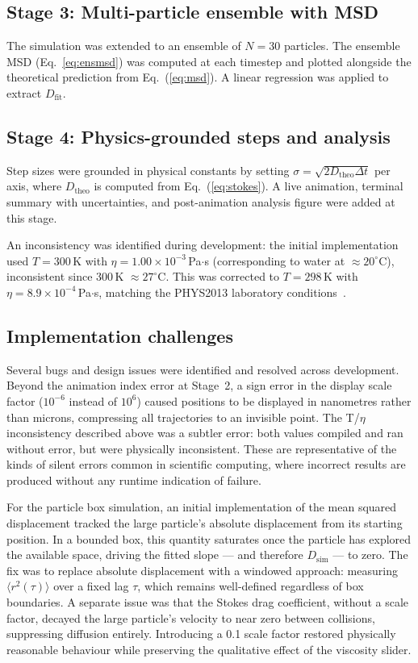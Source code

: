 \documentclass[prb,twocolumn]{revtex4-1}
\begin{document}
\subsection{Stage 3: Multi-particle ensemble with MSD}

The simulation was extended to an ensemble of $N = 30$ particles. The ensemble MSD (Eq.~\ref{eq:ensmsd}) was computed at each timestep and plotted alongside the theoretical prediction from Eq.~(\ref{eq:msd}). A linear regression was applied to extract $D_{\mathrm{fit}}$.

\subsection{Stage 4: Physics-grounded steps and analysis}

Step sizes were grounded in physical constants by setting $\sigma = \sqrt{2D_{\mathrm{theo}}\Delta t}$ per axis, where $D_{\mathrm{theo}}$ is computed from Eq.~(\ref{eq:stokes}). A live animation, terminal summary with uncertainties, and post-animation analysis figure were added at this stage.

An inconsistency was identified during development: the initial implementation used $T = 300$\,K with $\eta = 1.00\times10^{-3}$\,Pa$\cdot$s (corresponding to water at $\approx20^{\circ}$C), inconsistent since 300\,K $\approx 27^{\circ}$C. This was corrected to $T = 298$\,K with $\eta = 8.9\times10^{-4}$\,Pa$\cdot$s, matching the PHYS2013 laboratory conditions~\cite{lukacs2026lab}.

\subsection{Implementation challenges}

Several bugs and design issues were identified and resolved across development. Beyond the animation index error at Stage~2, a sign error in the display scale factor ($10^{-6}$ instead of $10^6$) caused positions to be displayed in nanometres rather than microns, compressing all trajectories to an invisible point. The T/$\eta$ inconsistency described above was a subtler error: both values compiled and ran without error, but were physically inconsistent. These are representative of the kinds of silent errors common in scientific computing, where incorrect results are produced without any runtime indication of failure.

For the particle box simulation, an initial implementation of the mean squared displacement tracked the large particle's absolute displacement from its starting position. In a bounded box, this quantity saturates once the particle has explored the available space, driving the fitted slope --- and therefore $D_{\mathrm{sim}}$ --- to zero. The fix was to replace absolute displacement with a windowed approach: measuring $\langle r^2(\tau)\rangle$ over a fixed lag $\tau$, which remains well-defined regardless of box boundaries. A separate issue was that the Stokes drag coefficient, without a scale factor, decayed the large particle's velocity to near zero between collisions, suppressing diffusion entirely. Introducing a 0.1 scale factor restored physically reasonable behaviour while preserving the qualitative effect of the viscosity slider.
\end{document}
